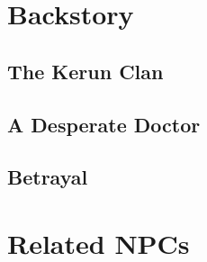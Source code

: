 \documentclass[12pt]{article}
\newif\iffull
\begin{document}
\iffull
  \section{Backstory}

  \subsection{The Kerun Clan}

  \subsection{A Desperate Doctor}

  \subsection{Betrayal}

  \section{Related NPCs}
\end{document}
